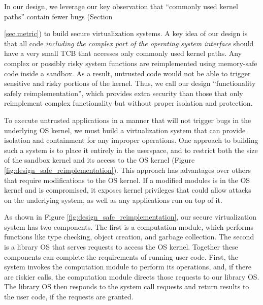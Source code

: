 In our design, we leverage our key observation
 that ``commonly used kernel paths'' contain fewer bugs
(Section {\ref{sec.metric}) to build secure virtualization systems.
A key idea of our design is that all code \emph{including the complex part
of the operating system interface} should have a very small TCB that accesses only
commonly used kernel paths.
Any complex or possibly risky system functions
are reimplemented using memory-safe code inside a sandbox. 
As a result, untrusted code would not be able to
trigger sensitive and risky portions of the kernel. 
Thus, we call our design ``functionality safely reimplementation'', 
which provides extra security than those that only reimplement 
complex functionality but without proper isolation and protection. 

To execute untrusted applications in a manner that will not trigger bugs
in the underlying OS kernel, %
we must build a virtualization system that can provide isolation and
containment for any improper operations.
One approach to building such a system is to place it entirely in the userspace,
and to restrict both the size of the sandbox kernel and its access to the
OS kernel (Figure \ref{fig:design_safe_reimplementation}).
This approach has advantages over others that require modifications to
the OS kernel. 
If a modified modules is in the OS kernel and is compromised, it exposes 
kernel privileges that could allow attacks
on the underlying system, as well as any applications run on top of it.

As shown in Figure \ref{fig:design_safe_reimplementation}, our secure virtualization system
has two components.
The first is a computation module, which performs functions like type checking,
object creation, and garbage collection. 
The second is a library OS that
serves requests to access the OS kernel.
Together these components can complete the requirements of running user code.
First, the system invokes the computation module to perform its operations,
and, if there are riskier calls, the computation module directs those requests to our
library OS. The library OS then responds to the system call requests and
return results to the user code, if the requests are granted.


}
